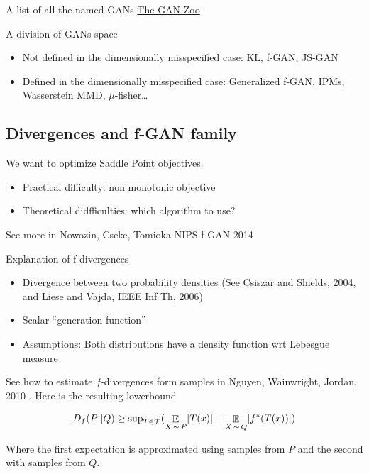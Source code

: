 \documentclass[b5paper]{report}
\begin{document}
A list of all the named GANs
\href{https://github.com/hindupuravinash/the-gan-zoo}{The GAN Zoo}

A division of GANs space

\begin{itemize}
  \item Not defined in the dimensionally misspecified case: KL, f-GAN, JS-GAN
  \item Defined in the dimensionally misspecified case: Generalized f-GAN,
    IPMs, Wasserstein MMD, $\mu$-fisher\dots
\end{itemize}

\subsection{Divergences and f-GAN family}

We want to optimize Saddle Point objectives.

\begin{itemize}
  \item Practical difficulty: non monotonic objective
  \item Theoretical didfficulties: which algorithm to use?
\end{itemize}


See more in Nowozin, Cseke, Tomioka NIPS f-GAN 2014 \cite{nowozin2016f}

Explanation of f-divergences

\begin{itemize}
  \item Divergence between two probability densities (See Csiszar and Shields,
    2004, and Liese and Vajda, IEEE Inf Th, 2006)
  \item Scalar ``generation function''
  \item Assumptions: Both distributions have a density function wrt Lebesgue
    measure
\end{itemize}

See how to estimate $f$-divergences form samples in Nguyen, Wainwright, Jordan,
2010 \cite{nguyen2010estimating}. Here is the resulting lowerbound

\begin{equation}
  D_f(P||Q) \ge \text{sup}_{T \in \mathcal{T}}( \operatorname*{\mathbb{\mathop{E}}}_{X\operatorname*{\sim} P}[T(x)] - \operatorname*{\mathbb{\mathop{E}}}_{X\operatorname*{\sim} Q}[f^*(T(x))])
\end{equation}

Where the first expectation is approximated using samples from $P$ and the
second with samples from $Q$.
\end{document}
